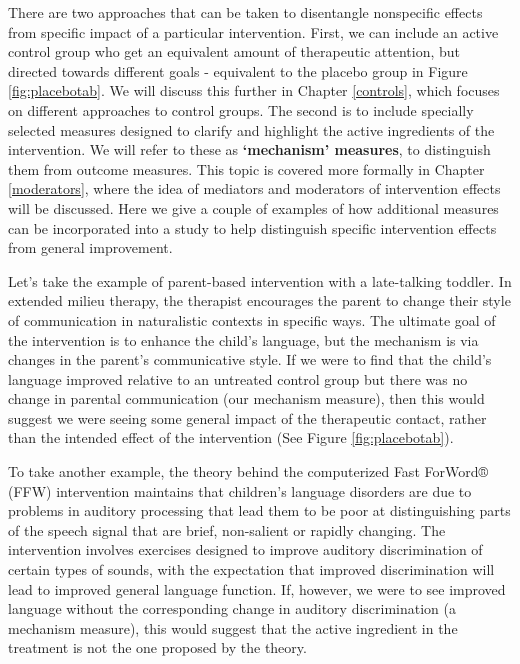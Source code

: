 \documentclass{krantz}
\begin{document}
There are two approaches that can be taken to disentangle nonspecific effects from specific impact of a particular intervention. First, we can include an active control group who get an equivalent amount of therapeutic attention, but directed towards different goals - equivalent to the placebo group in Figure \ref{fig:placebotab}. We will discuss this further in Chapter \ref{controls}, which focuses on different approaches to control groups. The second is to include specially selected measures designed to clarify and highlight the active ingredients of the intervention. We will refer to these as \textbf{`mechanism' measures}, to distinguish them from outcome measures. This topic is covered more formally in Chapter \ref{moderators}, where the idea of mediators and moderators of intervention effects will be discussed. Here we give a couple of examples of how additional measures can be incorporated into a study to help distinguish specific intervention effects from general improvement.

Let's take the example of parent-based intervention with a late-talking toddler. In extended milieu therapy, the therapist encourages the parent to change their style of communication in naturalistic contexts in specific ways. The ultimate goal of the intervention is to enhance the child's language, but the mechanism is via changes in the parent's communicative style. If we were to find that the child's language improved relative to an untreated control group but there was no change in parental communication (our mechanism measure), then this would suggest we were seeing some general impact of the therapeutic contact, rather than the intended effect of the intervention (See Figure \ref{fig:placebotab}).

To take another example, the theory behind the computerized Fast ForWord® (FFW) intervention maintains that children's language disorders are due to problems in auditory processing that lead them to be poor at distinguishing parts of the speech signal that are brief, non-salient or rapidly changing. The intervention involves exercises designed to improve auditory discrimination of certain types of sounds, with the expectation that improved discrimination will lead to improved general language function. If, however, we were to see improved language without the corresponding change in auditory discrimination (a mechanism measure), this would suggest that the active ingredient in the treatment is not the one proposed by the theory.
\end{document}

